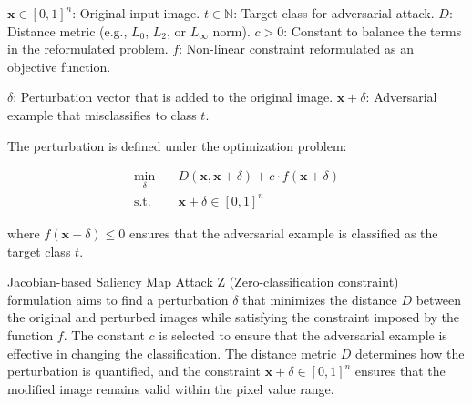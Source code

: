 $\mathbf{x} \in [0, 1]^n$: Original input image.
 $t \in \mathbb{N}$: Target class for adversarial attack.
 $D$: Distance metric (e.g., $L_0$, $L_2$, or $L_\infty$ norm).
$c > 0$: Constant to balance the terms in the reformulated problem.
$f$: Non-linear constraint reformulated as an objective function.

$\delta$: Perturbation vector that is added to the original image.
$\mathbf{x} + \delta$: Adversarial example that misclassifies to class $t$.


The perturbation is defined under the optimization problem:

\[
\begin{aligned}
\min_{\delta} & \quad D(\mathbf{x}, \mathbf{x} + \delta) + c \cdot f(\mathbf{x} + \delta) \\
\text{s.t.} & \quad \mathbf{x} + \delta \in [0, 1]^n
\end{aligned}
\]

where \( f(\mathbf{x} + \delta) \leq 0 \) ensures that the adversarial example is classified as the target class \( t \).

Jacobian-based Saliency Map Attack Z (Zero-classification constraint) formulation aims to find a perturbation \( \delta \) that minimizes the distance \( D \) between the original and perturbed images while satisfying the constraint imposed by the function \( f \). The constant \( c \) is selected to ensure that the adversarial example is effective in changing the classification. The distance metric \( D \) determines how the perturbation is quantified, and the constraint \( \mathbf{x} + \delta \in [0, 1]^n \) ensures that the modified image remains valid within the pixel value range.
